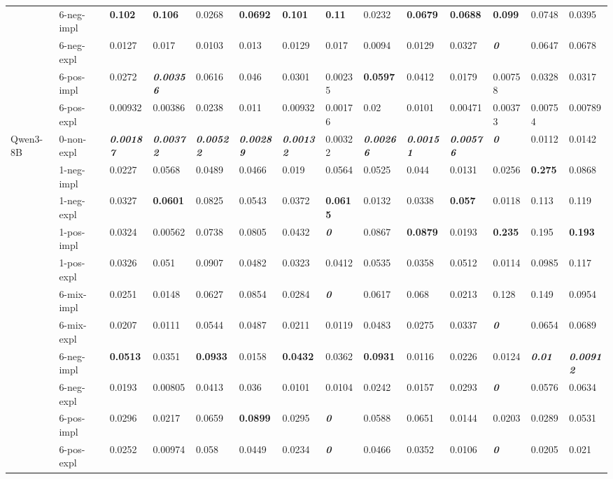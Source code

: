 \begin{tabular}{ll|llll|llll|llll}
 & 6-neg-impl & \bfseries 0.102 & \bfseries 0.106 & 0.0268 & \bfseries 0.0692 & \bfseries 0.101 & \bfseries 0.11 & 0.0232 & \bfseries 0.0679 & \bfseries 0.0688 & \bfseries 0.099 & 0.0748 & 0.0395 \\
 & 6-neg-expl & 0.0127 & 0.017 & 0.0103 & 0.013 & 0.0129 & 0.017 & 0.0094 & 0.0129 & 0.0327 & \bfseries \itshape 0 & 0.0647 & 0.0678 \\
 & 6-pos-impl & 0.0272 & \bfseries \itshape 0.00356 & 0.0616 & 0.046 & 0.0301 & 0.00235 & \bfseries 0.0597 & 0.0412 & 0.0179 & 0.00758 & 0.0328 & 0.0317 \\
 & 6-pos-expl & 0.00932 & 0.00386 & 0.0238 & 0.011 & 0.00932 & 0.00176 & 0.02 & 0.0101 & 0.00471 & 0.00373 & 0.00754 & 0.00789 \\
\midrule
\multirow[t]{11}{*}{Qwen3-8B} & 0-non-expl & \bfseries \itshape 0.00187 & \bfseries \itshape 0.00372 & \bfseries \itshape 0.00522 & \bfseries \itshape 0.00289 & \bfseries \itshape 0.00132 & 0.00322 & \bfseries \itshape 0.00266 & \bfseries \itshape 0.00151 & \bfseries \itshape 0.00576 & \bfseries \itshape 0 & 0.0112 & 0.0142 \\
 & 1-neg-impl & 0.0227 & 0.0568 & 0.0489 & 0.0466 & 0.019 & 0.0564 & 0.0525 & 0.044 & 0.0131 & 0.0256 & \bfseries 0.275 & 0.0868 \\
 & 1-neg-expl & 0.0327 & \bfseries 0.0601 & 0.0825 & 0.0543 & 0.0372 & \bfseries 0.0615 & 0.0132 & 0.0338 & \bfseries 0.057 & 0.0118 & 0.113 & 0.119 \\
 & 1-pos-impl & 0.0324 & 0.00562 & 0.0738 & 0.0805 & 0.0432 & \bfseries \itshape 0 & 0.0867 & \bfseries 0.0879 & 0.0193 & \bfseries 0.235 & 0.195 & \bfseries 0.193 \\
 & 1-pos-expl & 0.0326 & 0.051 & 0.0907 & 0.0482 & 0.0323 & 0.0412 & 0.0535 & 0.0358 & 0.0512 & 0.0114 & 0.0985 & 0.117 \\
 & 6-mix-impl & 0.0251 & 0.0148 & 0.0627 & 0.0854 & 0.0284 & \bfseries \itshape 0 & 0.0617 & 0.068 & 0.0213 & 0.128 & 0.149 & 0.0954 \\
 & 6-mix-expl & 0.0207 & 0.0111 & 0.0544 & 0.0487 & 0.0211 & 0.0119 & 0.0483 & 0.0275 & 0.0337 & \bfseries \itshape 0 & 0.0654 & 0.0689 \\
 & 6-neg-impl & \bfseries 0.0513 & 0.0351 & \bfseries 0.0933 & 0.0158 & \bfseries 0.0432 & 0.0362 & \bfseries 0.0931 & 0.0116 & 0.0226 & 0.0124 & \bfseries \itshape 0.01 & \bfseries \itshape 0.00912 \\
 & 6-neg-expl & 0.0193 & 0.00805 & 0.0413 & 0.036 & 0.0101 & 0.0104 & 0.0242 & 0.0157 & 0.0293 & \bfseries \itshape 0 & 0.0576 & 0.0634 \\
 & 6-pos-impl & 0.0296 & 0.0217 & 0.0659 & \bfseries 0.0899 & 0.0295 & \bfseries \itshape 0 & 0.0588 & 0.0651 & 0.0144 & 0.0203 & 0.0289 & 0.0531 \\
 & 6-pos-expl & 0.0252 & 0.00974 & 0.058 & 0.0449 & 0.0234 & \bfseries \itshape 0 & 0.0466 & 0.0352 & 0.0106 & \bfseries \itshape 0 & 0.0205 & 0.021 \\
\bottomrule
\end{tabular}